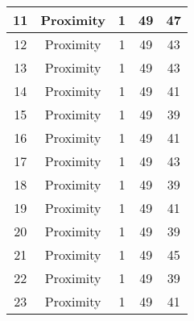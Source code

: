 \documentclass[results.tex]{subfiles}
\begin{document}
\begin{center}
\begin{tabular}{| c || c | c | c | c |}
            \hline
            11                      & Proximity                    & 1                      & 49                      & 47                   \\
            \hline
            12                      & Proximity                    & 1                      & 49                      & 43                   \\
            \hline
            13                      & Proximity                    & 1                      & 49                      & 43                   \\
            \hline
            14                      & Proximity                    & 1                      & 49                      & 41                   \\
            \hline
            15                      & Proximity                    & 1                      & 49                      & 39                   \\
            \hline
            16                      & Proximity                    & 1                      & 49                      & 41                   \\
            \hline
            17                      & Proximity                    & 1                      & 49                      & 43                   \\
            \hline
            18                      & Proximity                    & 1                      & 49                      & 39                   \\
            \hline
            19                      & Proximity                    & 1                      & 49                      & 41                   \\
            \hline
            20                      & Proximity                    & 1                      & 49                      & 39                   \\
            \hline
            21                      & Proximity                    & 1                      & 49                      & 45                   \\
            \hline
            22                      & Proximity                    & 1                      & 49                      & 39                   \\
            \hline
            23                      & Proximity                    & 1                      & 49                      & 41                   \\

\end{tabular}
\end{center}
\end{document}
